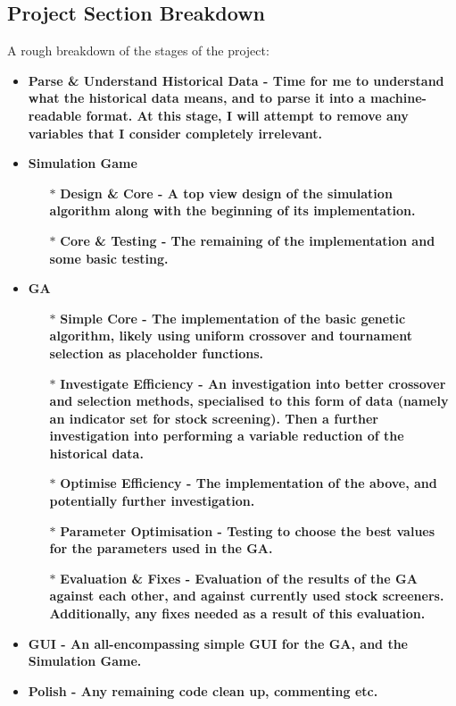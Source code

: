 \subsection{Project Section Breakdown}
A rough breakdown of the stages of the project:
\begin{itemize}
\item \bf Parse \& Understand Historical Data \rm - Time for me to understand what the historical data means, and to parse it into a machine-readable format. At this stage, I will attempt to remove any variables that I consider completely irrelevant.
\item \bf Simulation Game \rm
\begin{itemize}
    \item[$\ast$] \bf Design \& Core \rm - A top view design of the simulation algorithm along with the beginning of its implementation.
    \item[$\ast$] \bf Core \& Testing \rm - The remaining of the implementation and some basic testing.
\end{itemize}
\item \bf GA
\begin{itemize}
    \item[$\ast$] \bf Simple Core \rm - The implementation of the basic genetic algorithm, likely using uniform crossover and tournament selection as placeholder functions.
    \item[$\ast$] \bf Investigate Efficiency \rm - An investigation into better crossover and selection methods, specialised to this form of data (namely an indicator set for stock screening). Then a further investigation into performing a variable reduction of the historical data.
    \item[$\ast$] \bf Optimise Efficiency \rm - The implementation of the above, and potentially further investigation.
    \item[$\ast$] \bf Parameter Optimisation \rm - Testing to choose the best values for the parameters used in the GA.
    \item[$\ast$] \bf Evaluation \& Fixes \rm - Evaluation of the results of the GA against each other, and against currently used stock screeners. Additionally, any fixes needed as a result of this evaluation.
\end{itemize}
\item \bf GUI \rm - An all-encompassing simple GUI for the GA, and the Simulation Game.
\item \bf Polish \rm - Any remaining code clean up, commenting etc.
\end{itemize}

